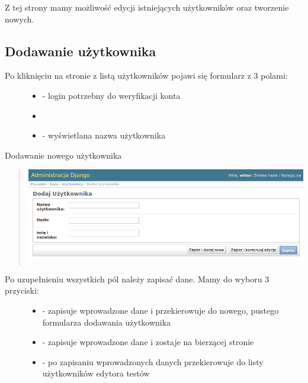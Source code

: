 \documentclass[letterpaper,10pt,polish]{sphinxmanual}
\begin{document}
Z tej strony mamy możliwość edycji istniejących użytkowników oraz tworzenie nowych.


\subsection{Dodawanie użytkownika}
\label{index:dodawanie-uzytkownika}\begin{description}
\item[{Po kliknięciu  na stronie z listą użytkowników pojawi się formularz z 3 polami:}] \leavevmode\begin{itemize}
\item {} 
 - login potrzebny do weryfikacji konta

\item {} 

\item {} 
 - wyświetlana nazwa użytkownika

\end{itemize}

\end{description}

Dodawanie nowego użytkownika
\begin{quote}

\includegraphics{DodajUzytkownika.png}
\end{quote}
\begin{description}
\item[{Po uzupełnieniu wszystkich pól należy zapisać dane. Mamy do wyboru 3 przyciski:}] \leavevmode\begin{itemize}
\item {} 
 - zapisuje wprowadzone dane i przekierowuje do nowego, pustego formularza dodawania użytkownika

\item {} 
 - zapisuje wprowadzone dane i zostaje na bierzącej stronie

\item {} 
 - po zapisaniu wprowadzonych danych przekierowuje do listy użytkowników edytora testów

\end{itemize}

\end{description}
\end{document}
